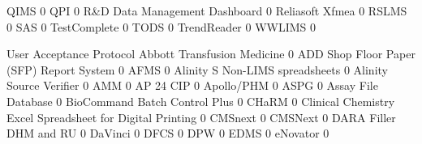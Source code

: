 \documentclass{article}
\begin{document}
\begin{Schunk}
\begin{Soutput}
  QIMS                                                            0
  QPI                                                             0
  R&D Data Management Dashboard                                   0
  Reliasoft Xfmea                                                 0
  RSLMS                                                           0
  SAS                                                             0
  TestComplete                                                    0
  TODS                                                            0
  TrendReader                                                     0
  WWLIMS                                                          0
                                                           
                                                            User Acceptance Protocol
  Abbott Transfusion Medicine                                                      0
  ADD Shop Floor Paper (SFP) Report System                                         0
  AFMS                                                                             0
  Alinity S Non-LIMS spreadsheets                                                  0
  Alinity Source Verifier                                                          0
  AMM                                                                              0
  AP 24 CIP                                                                        0
  Apollo/PHM                                                                       0
  ASPG                                                                             0
  Assay File Database                                                              0
  BioCommand Batch Control Plus                                                    0
  CHaRM                                                                            0
  Clinical Chemistry Excel Spreadsheet for Digital Printing                        0
  CMSnext                                                                          0
  CMSNext                                                                          0
  DARA Filler DHM and RU                                                           0
  DaVinci                                                                          0
  DFCS                                                                             0
  DPW                                                                              0
  EDMS                                                                             0
  eNovator                                                                         0

\end{Soutput}
\end{Schunk}
\end{document}

